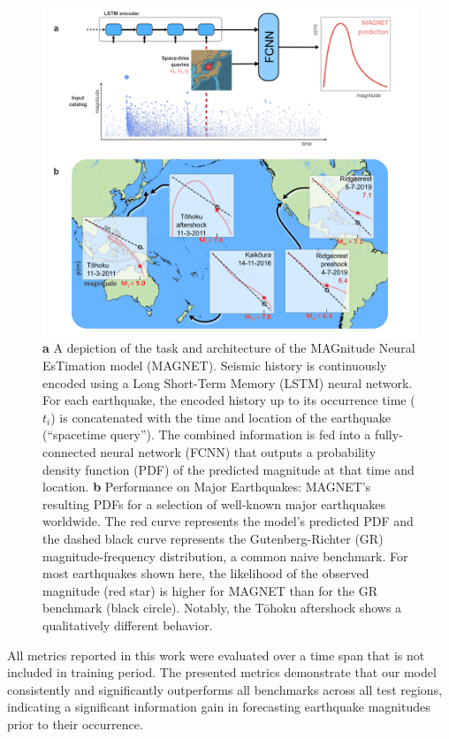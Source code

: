 \documentclass[pdflatex]{sn-jnl}
\begin{document}
\begin{figure}[h!]
	\centering
        \includegraphics[width=1\textwidth]{figures/intro_fig.png}
	\caption{\textbf{a} A depiction of the task and architecture of the MAGnitude Neural EsTimation model (MAGNET). Seismic history is continuously encoded using a Long Short-Term Memory (LSTM) neural network. For each earthquake, the encoded history up to its occurrence time ($t_i$) is concatenated with the time and location of the earthquake (``spacetime query''). The combined information is fed into a fully-connected neural network (FCNN) that outputs a probability density function (PDF) of the predicted magnitude at that time and location. \textbf{b} Performance on Major Earthquakes: MAGNET's resulting PDFs for a selection of well-known major earthquakes worldwide. The red curve represents the model's predicted PDF and the dashed black curve represents the Gutenberg-Richter (GR) magnitude-frequency distribution, a common naive benchmark. For most earthquakes shown here, the likelihood of the observed magnitude (red star) is higher for MAGNET than for the GR benchmark (black circle). Notably, the Tōhoku aftershock shows a qualitatively different behavior.
    }
\label{fig:intro_fig}
\end{figure}

All metrics reported in this work were evaluated over a time span that is not included in training period. The presented metrics demonstrate that our model consistently and significantly outperforms all benchmarks across all test regions, indicating a significant information gain in forecasting earthquake magnitudes prior to their occurrence.
\end{document}
